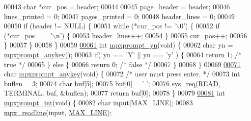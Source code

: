 \begin{DoxyCode}
{{00043         \textcolor{keywordtype}{char} *cur\_pos   = header;
00044 
00045         page\_header     = header;
00046         lines\_printed   = 0;
00047         pages\_printed   = 0;
00048         header\_lines    = 0;
00049 
00050         \textcolor{keywordflow}{if} (header != NULL) \{
00051                 \textcolor{keywordflow}{while} (*cur\_pos != \textcolor{charliteral}{'\(\backslash\)0'}) \{
00052                         \textcolor{keywordflow}{if} (*cur\_pos == \textcolor{charliteral}{'\(\backslash\)n'}) \{
00053                                 header\_lines++;
00054                         \}
00055                         cur\_pos++;
00056                 \}
00057         \}
00058 \}
00059 
\hypertarget{mpx__util_8c_source_l00061}{}\hyperlink{mpx__util_8h_a8e31250a20e8bc8e7106f5a37c391199}{00061} \textcolor{keywordtype}{int} \hyperlink{mpx__util_8c_a8e31250a20e8bc8e7106f5a37c391199}{mpxprompt_yn}(\textcolor{keywordtype}{void}) \{
00062         \textcolor{keywordtype}{char} yn = \hyperlink{mpx__util_8c_a338d01dfe3c80732c00450203c85b964}{mpxprompt_anykey}();
00063         \textcolor{keywordflow}{if}( yn == \textcolor{charliteral}{'Y'} || yn == \textcolor{charliteral}{'y'} ) \{
00064                 \textcolor{keywordflow}{return} 1; \textcolor{comment}{/* true */}
00065         \} \textcolor{keywordflow}{else} \{
00066                 \textcolor{keywordflow}{return} 0; \textcolor{comment}{/* false */}
00067         \}
00068 \}
00069 
\hypertarget{mpx__util_8c_source_l00071}{}\hyperlink{mpx__util_8h_a338d01dfe3c80732c00450203c85b964}{00071} \textcolor{keywordtype}{char} \hyperlink{mpx__util_8c_a338d01dfe3c80732c00450203c85b964}{mpxprompt_anykey}(\textcolor{keywordtype}{void}) \{
00072         \textcolor{comment}{/* user must press enter. */}
00073         \textcolor{keywordtype}{int} buflen = 3;
00074         \textcolor{keywordtype}{char} buf[5];
00075         buf[0] = \textcolor{charliteral}{' '};
00076         sys\_req(\hyperlink{_m_p_x___r5_8h_ada74e7db007a68e763f20c17f2985356}{READ}, TERMINAL, buf, &buflen);
00077         \textcolor{keywordflow}{return} buf[0];
00078 \}
00079 
\hypertarget{mpx__util_8c_source_l00081}{}\hyperlink{mpx__util_8h_aacc3dfe470919b0bd1133bce90383e18}{00081} \textcolor{keywordtype}{int} \hyperlink{mpx__util_8c_aacc3dfe470919b0bd1133bce90383e18}{mpxprompt_int}(\textcolor{keywordtype}{void}) \{
00082         \textcolor{keywordtype}{char} input[MAX\_LINE];
00083         \hyperlink{mpx__util_8c_a781169ab05ad54c0d37253d73060b77f}{mpx_readline}(input, \hyperlink{mpx__cmd_8h_a842ed03f27719bc87666bfd1f75415b8}{MAX_LINE});  
}}
\end{DoxyCode}
